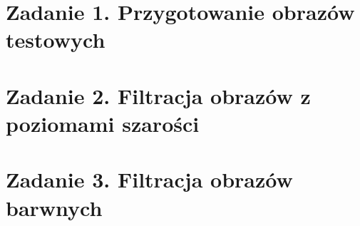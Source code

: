 



 


\section*{Zadanie 1. Przygotowanie obrazów testowych}




\section*{Zadanie 2. Filtracja obrazów z poziomami szarości}




\section*{Zadanie 3. Filtracja obrazów barwnych}





